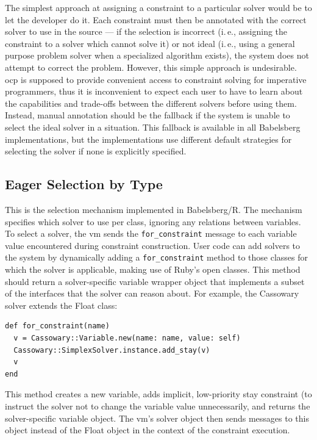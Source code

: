 \documentclass[numbers]{sigplanconf}
\newcommand{\ac}[1]{\gls{#1}}
\newcommand{\Ac}[1]{\Gls{#1}}
\newcommand{\hairspace}{\,}
\newcommand{\ie}{i.\hairspace{}e.,\xspace}
\begin{document}
The simplest approach at assigning a constraint to a particular solver would be
to let the developer do it. Each constraint must then be annotated with the
correct solver to use in the source --- if the selection is incorrect (\ie
assigning the constraint to a solver which cannot solve it) or not ideal (\ie
using a general purpose problem solver when a specialized algorithm exists), the
system does not attempt to correct the problem. However, this simple approach is
undesirable. \Ac{ocp} is supposed to provide convenient access to constraint
solving for imperative programmers, thus it is inconvenient to expect each user
to have to learn about the capabilities and trade-offs between the different
solvers before using them. Instead, manual annotation should be the fallback if
the system is unable to select the ideal solver in a situation. This fallback is
available in all Babelsberg implementations, but the implementations use
different default strategies for selecting the solver if none is explicitly
specified.

\subsection{Eager Selection by Type}
This is the selection mechanism implemented in Babelsberg/R. The mechanism
specifies which solver to use per class, ignoring any relations between
variables. To select a solver, the \ac{vm} sends the \lstinline{for_constraint}
message to each variable value encountered during constraint construction. User
code can add solvers to the system by dynamically adding a
\lstinline{for_constraint} method to those classes for which the solver is
applicable, making use of Ruby's open classes. This method should return a
solver-specific variable wrapper object that implements a subset of the
interfaces that the solver can reason about. For example, the Cassowary solver
extends the Float class:
\begin{lstlisting}
def for_constraint(name)
  v = Cassowary::Variable.new(name: name, value: self)
  Cassowary::SimplexSolver.instance.add_stay(v)
  v
end
\end{lstlisting}
This method creates a new variable, adds implicit, low-priority stay constraint
(to instruct the solver not to change the variable value unnecessarily, and
returns the solver-specific variable object. The \ac{vm}'s solver object then
sends messages to this object instead of the Float object in the context of the
constraint execution.
\end{document}

